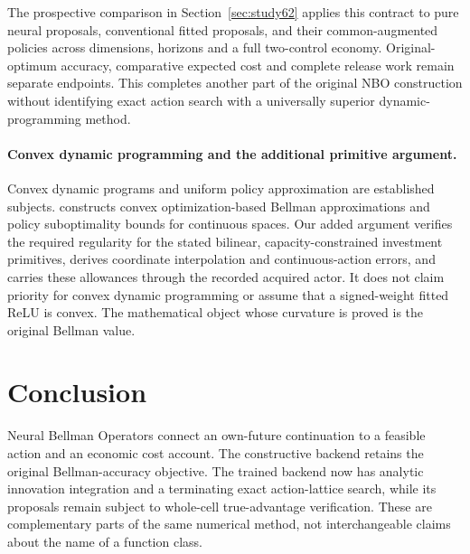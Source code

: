 \documentclass[ecta,nameyear,draft]{econsocart}
\begin{document}
The prospective comparison in Section~\ref{sec:study62} applies this contract to pure neural proposals, conventional fitted proposals, and their common-augmented policies across dimensions, horizons and a full two-control economy. Original-optimum accuracy, comparative expected cost and complete release work remain separate endpoints. This completes another part of the original NBO construction without identifying exact action search with a universally superior dynamic-programming method.

\paragraph{Convex dynamic programming and the additional primitive argument.}
Convex dynamic programs and uniform policy approximation are established subjects. \citet{yang2020convex} constructs convex optimization-based Bellman approximations and policy suboptimality bounds for continuous spaces. Our added argument verifies the required regularity for the stated bilinear, capacity-constrained investment primitives, derives coordinate interpolation and continuous-action errors, and carries these allowances through the recorded acquired actor. It does not claim priority for convex dynamic programming or assume that a signed-weight fitted ReLU is convex. The mathematical object whose curvature is proved is the original Bellman value.





















\section{Conclusion}\label{sec:conclusion56}
Neural Bellman Operators connect an own-future continuation to a feasible action and an economic cost account. The constructive backend retains the original Bellman-accuracy objective. The trained backend now has analytic innovation integration and a terminating exact action-lattice search, while its proposals remain subject to whole-cell true-advantage verification. These are complementary parts of the same numerical method, not interchangeable claims about the name of a function class.
\end{document}
